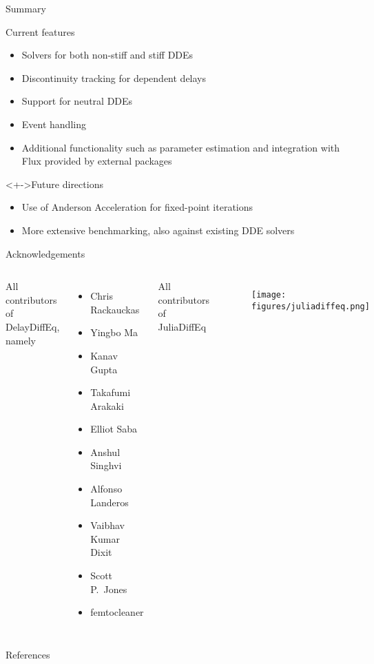 \documentclass[aspectratio=169]{beamer}
\begin{document}
\begin{frame}{Summary}
  \begin{block}{Current features}
    \begin{itemize}[<+->]
    \item Solvers for both non-stiff and stiff DDEs
    \item Discontinuity tracking for dependent delays
    \item Support for neutral DDEs
    \item Event handling
    \item Additional functionality such as parameter estimation and integration with Flux provided by external packages
    \end{itemize}
  \end{block}

  \begin{block}<+->{Future directions}
    \begin{itemize}
    \item Use of Anderson Acceleration for fixed-point iterations
    \item<+-> More extensive benchmarking, also against existing DDE solvers
    \end{itemize}
  \end{block}
\end{frame}

\begin{frame}{Acknowledgements}
  \begin{columns}[t]
    All contributors of DelayDiffEq, namely
    \begin{itemize}
    \item Chris Rackauckas
    \item Yingbo Ma
    \item Kanav Gupta
    \item Takafumi Arakaki
    \item Elliot Saba
    \item Anshul Singhvi
    \item Alfonso Landeros
    \item Vaibhav Kumar Dixit
    \item Scott P.\ Jones
    \item femtocleaner
    \end{itemize}

    \pause

    All contributors of JuliaDiffEq

    \begin{figure}
      \begin{center}
        \texttt{[image: figures/juliadiffeq.png]}
      \end{center}
    \end{figure}
  \end{columns}
\end{frame}

\appendix

\begin{frame}{References}
  \printbibliography[heading=none]
\end{frame}
\end{document}

